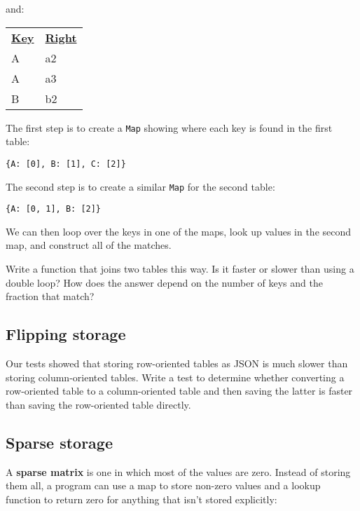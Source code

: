 \documentclass[krantzl]{krantz}
\newcommand{\glossref}[1]{\textbf{#1}}
\begin{document}
\vspace{\baselineskip}


\noindent and:


\vspace{\baselineskip}
\begin{tabular}{ll}
\textbf{\underline{Key}} & \textbf{\underline{Right}} \\
A & a2 \\
A & a3 \\
B & b2 \\
\end{tabular}

\vspace{\baselineskip}


The first step is to create a \texttt{Map} showing where each key is found in the first table:

\begin{lstlisting}[frame=single,frameround=tttt]
{A: [0], B: [1], C: [2]}
\end{lstlisting}


\noindent The second step is to create a similar \texttt{Map} for the second table:

\begin{lstlisting}[frame=single,frameround=tttt]
{A: [0, 1], B: [2]}
\end{lstlisting}


\noindent We can then loop over the keys in one of the maps,
look up values in the second map,
and construct all of the matches.


Write a function that joins two tables this way.
Is it faster or slower than using a double loop?
How does the answer depend on the number of keys and the fraction that match?

\subsection*{Flipping storage}


Our tests showed that storing row-oriented tables as JSON
is much slower than storing column-oriented tables.
Write a test to determine whether converting a row-oriented table to a column-oriented table
and then saving the latter
is faster than saving the row-oriented table directly.

\subsection*{Sparse storage}


A \glossref{sparse matrix} is one in which most of the values are zero.
Instead of storing them all,
a program can use a map to store non-zero values
and a lookup function to return zero for anything that isn't stored explicitly:
\end{document}
